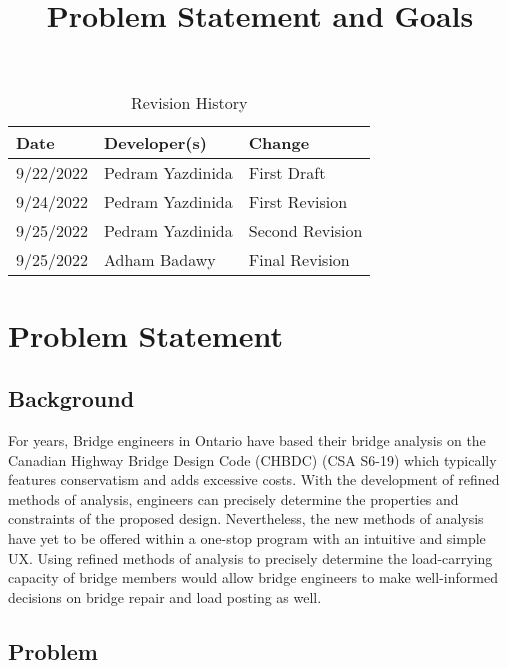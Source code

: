 \documentclass{article}
\title{Problem Statement and Goals\\\progname}
\author{\authname}
\date{}
\begin{document}
\maketitle

\begin{table}[hp]
\caption{Revision History} \label{TblRevisionHistory}
\begin{tabularx}{\textwidth}{llX}
\toprule
\textbf{Date} & \textbf{Developer(s)} & \textbf{Change}\\
\midrule
9/22/2022 & Pedram Yazdinida & First Draft\\
9/24/2022 & Pedram Yazdinida & First Revision\\
9/25/2022 & Pedram Yazdinida & Second Revision\\
9/25/2022 & Adham Badawy & Final Revision\\
\bottomrule
\end{tabularx}
\end{table}

\section{Problem Statement}

\subsection{Background}

For years, Bridge engineers in Ontario have based their bridge analysis on the Canadian Highway Bridge Design Code (CHBDC) (CSA S6-19) which typically features conservatism and adds excessive costs. With the development of refined methods of analysis, engineers can precisely determine the properties and constraints of the proposed design. Nevertheless, the new methods of analysis have yet to be offered within a one-stop program with an intuitive and simple UX. Using refined methods of analysis to precisely determine the load-carrying capacity of bridge members would allow bridge engineers to make well-informed decisions on bridge repair and load posting as well. 
 
\subsection{Problem}
\end{document}
